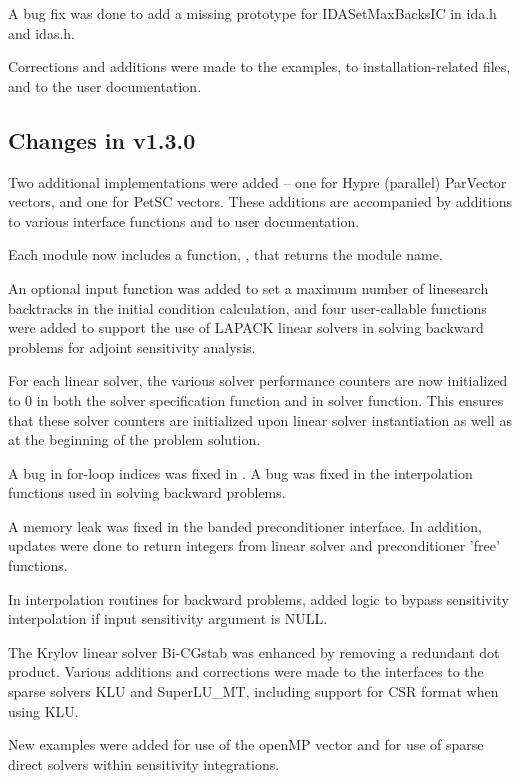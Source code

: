 A bug fix was done to add a missing prototype for IDASetMaxBacksIC 
in ida.h and idas.h.
 
Corrections and additions were made to the examples, 
to installation-related files,
and to the user documentation.

\subsection*{Changes in v1.3.0}

Two additional {\nvector} implementations were added -- one for
Hypre (parallel) ParVector vectors, and one for PetSC vectors.  These
additions are accompanied by additions to various interface functions
and to user documentation.

Each {\nvector} module now includes a function, ,
that returns the {\nvector} module name.

An optional input function was added to set a maximum number
of linesearch backtracks in the initial condition calculation, and
four user-callable functions were added to support the use of LAPACK
linear solvers in solving backward problems for adjoint sensitivity
analysis.

For each linear solver, the various solver performance counters are
now initialized to 0 in both the solver specification function and in
solver  function.  This ensures that these solver counters
are initialized upon linear solver instantiation as well as at the
beginning of the problem solution.

A bug in for-loop indices was fixed in . A bug was
fixed in the interpolation functions used in solving backward problems.

A memory leak was fixed in the banded preconditioner interface.
In addition, updates were done to return integers from linear solver 
and preconditioner 'free' functions.

In interpolation routines for backward problems, added logic to bypass 
sensitivity interpolation if input sensitivity argument is NULL.

The Krylov linear solver Bi-CGstab was enhanced by removing a redundant
dot product.  Various additions and corrections were made to the
interfaces to the sparse solvers KLU and SuperLU\_MT, including support
for CSR format when using KLU.

New examples were added for use of the openMP vector and for use of 
sparse direct solvers within sensitivity integrations.

